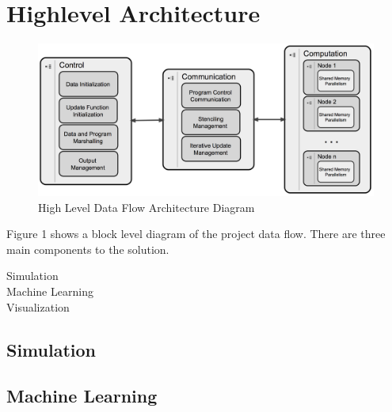 \section{Highlevel Architecture}
\label{architecture}


\begin{figure}[h]
\begin{center}
\includegraphics[scale=0.4]{arch.png}
\caption{High Level Data Flow Architecture Diagram}
\label{fig:arch}
\end{center}
\end{figure}


Figure 1 shows a block level diagram of the project data flow. There are three main components to the solution.
\begin{description}
\item[Simulation] 
\item[Machine Learning]
\item[Visualization]
\end{description}

\subsection{Simulation}

\subsection{Machine Learning}

